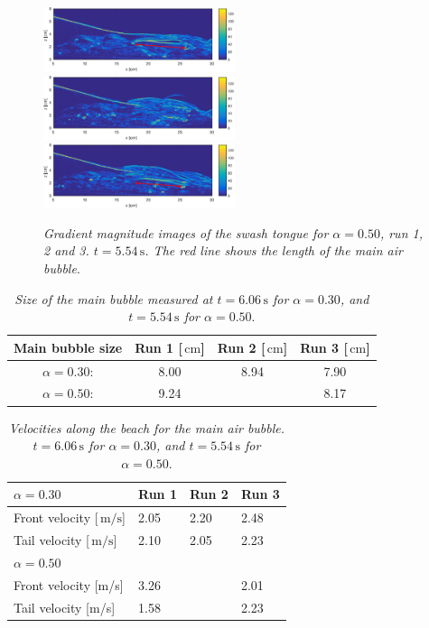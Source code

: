 \documentclass[review, authoryear]{elsarticle}
\newcommand{\s}{\,\mbox{s}}
\newcommand{\cm}{\,\mbox{cm}}
\newcommand{\mps}{\,\mbox{m/s}}
\begin{document}
\begin{figure}[]
\centering
\includegraphics[angle=5.1,width=0.5\textwidth]{./Figures/BUBBLE/bubble50_run1_r.eps}
\includegraphics[angle=5.1,width=0.5\textwidth]{./Figures/BUBBLE/bubble50_run2_r.eps}
\includegraphics[angle=5.1,width=0.5\textwidth]{./Figures/BUBBLE/bubble50_run3_r.eps}
\caption{\textit{Gradient magnitude images of the swash tongue for $\alpha=0.50$, run 1, 2 and 3. $t=5.54\s$. The red line shows the length of the main air bubble}.}
\label{fig:bubble_50}
\end{figure} 


\begin{table}[]
\centering
\caption{\textit{ Size of the main bubble measured at $t=6.06\s$ for $\alpha=0.30$, and $t=5.54\s$ for $\alpha=0.50$}.}
\label{my-label}
\begin{tabular}{|c|c|c|c|}
\hline
\textbf{Main bubble size }              & \textbf{Run 1 {[}$\cm${]}} & \textbf{Run 2 {[}$\cm${]}} & \textbf{Run 3 {[}$\cm${]}} \\ \hline
$\alpha=0.30$:  & 8.00     & 8.94     & 7.90     \\ \hline
$\alpha=0.50$: & 9.24     &      & 8.17     \\ \hline
\end{tabular}
\label{tab:b_case30}
\end{table}
 
 
\begin{table}[]
\centering
\caption{\textit{ Velocities along the beach for the main air bubble. $t=6.06\s$ for $\alpha=0.30$, and $t=5.54\s$ for $\alpha=0.50$}.}
\label{vel_bubb}
\begin{tabular}{llll}
\hline
{\bf $\alpha=0.30$}                    & Run 1 & Run 2 & Run 3 \\ \hline
Front velocity {[}$\mps${]}  & 2.05  & 2.20  & 2.48  \\
Tail velocity {[}$\mps${]}  & 2.10  & 2.05  & 2.23  \\ \hline
{\bf $\alpha=0.50$}                    &       &       &       \\ \hline
Front velocity {[}m/s{]}  & 3.26  &   & 2.01  \\
Tail velocity {[}m/s{]}   & 1.58  &   & 2.23 
\end{tabular}
\end{table} 
 
\end{document}
